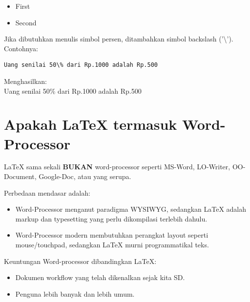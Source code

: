 \documentclass{book} %
\begin{document}
    \begin{itemize}
        \item First %
        \item Second %
    \end{itemize}

	\newpage
    Jika dibutuhkan menulis simbol persen, ditambahkan simbol backslash ('\textbackslash').
    Contohnya:

    \begin{verbatim}
Uang senilai 50\% dari Rp.1000 adalah Rp.500
    \end{verbatim}

    Menghasilkan: \\
    Uang senilai 50\% dari Rp.1000 adalah Rp.500

    \section{Apakah \LaTeX{} termasuk Word-Processor}

    \LaTeX{} sama sekali \textbf{BUKAN} word-processor seperti MS-Word, LO-Writer, OO-Document, Google-Doc, atau yang serupa.

    \bigskip

    Perbedaan mendasar adalah:
    \begin{itemize}
        \item Word-Processor menganut paradigma WYSIWYG,
        sedangkan \LaTeX{} adalah markup dan typesetting yang perlu dikompilasi terlebih dahulu.

        \item Word-Processor modern membutuhkan perangkat layout seperti mouse/touchpad,
        sedangkan \LaTeX{} murni programmatikal teks.
    \end{itemize}

    \bigskip

    Keuntungan Word-processor dibandingkan \LaTeX{}:
    \begin{itemize}
        \item Dokumen workflow yang telah dikenalkan sejak kita SD.
        \item Penguna lebih banyak dan lebih umum.
    \end{itemize}

    \bigskip
\end{document}
